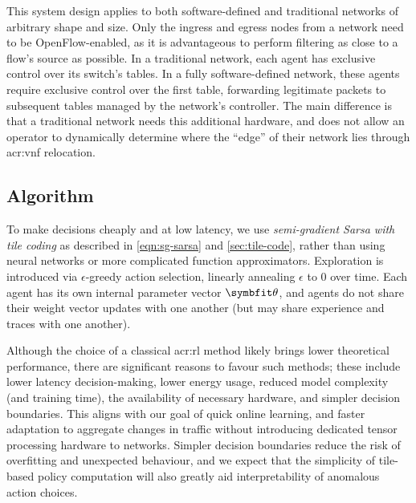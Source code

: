 This system design applies to both software-defined and traditional networks of arbitrary shape and size.
Only the ingress and egress nodes from a network need to be OpenFlow-enabled, as it is advantageous to perform filtering as close to a flow's source as possible.
In a traditional network, each agent has exclusive control over its switch's tables.
In a fully software-defined network, these agents require exclusive control over the first table, forwarding legitimate packets to subsequent tables managed by the network's controller.
The main difference is that a traditional network needs this additional hardware, and does not allow an operator to dynamically determine where the ``edge'' of their network lies through \gls{acr:vnf} relocation.

\subsection{Algorithm}
To make decisions cheaply and at low latency, we use \emph{semi-gradient Sarsa with tile coding} as described in \cref{eqn:sg-sarsa} and \cref{sec:tile-code}, rather than using neural networks or more complicated function approximators.
Exploration is introduced via $\epsilon$-greedy action selection, linearly annealing $\epsilon$ to 0 over time.
Each agent has its own internal parameter vector $\wvec{}$, and agents do not share their weight vector updates with one another (but may share experience and traces with one another).

Although the choice of a classical \gls{acr:rl} method likely brings lower theoretical performance, there are significant reasons to favour such methods; these include lower latency decision-making, lower energy usage, reduced model complexity (and training time), the availability of necessary hardware, and simpler decision boundaries.
This aligns with our goal of quick online learning, and faster adaptation to aggregate changes in traffic without introducing dedicated tensor processing hardware to networks.
Simpler decision boundaries reduce the risk of overfitting and unexpected behaviour, and we expect that the simplicity of tile-based policy computation will also greatly aid interpretability of anomalous action choices.

